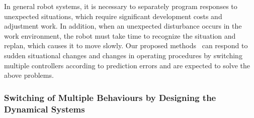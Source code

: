 In general robot systems, it is necessary to separately program responses to unexpected situations, which require significant development costs and adjustment work. In addition, when an unexpected disturbance occurs in the work environment, the robot must take time to recognize the situation and replan, which causes it to move slowly. Our proposed methods~\cite{Ito2022sr,Suzuki2021ral} can respond to sudden situational changes and changes in operating procedures by switching multiple controllers according to prediction errors and are expected to solve the above problems.


\subsubsection{Switching of Multiple Behaviours by Designing the Dynamical Systems}

